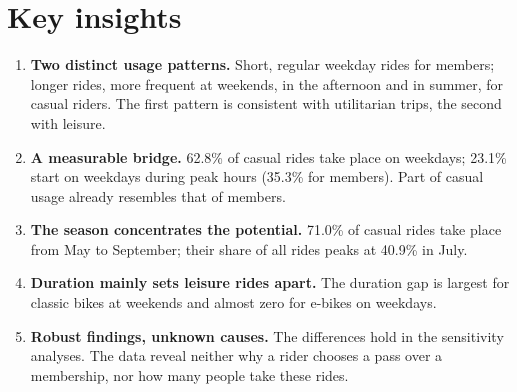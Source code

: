 \section{Key insights}
\label{sec:insights}

\begin{enumerate}
  \item \textbf{Two distinct usage patterns.} \Mes{} Short, regular weekday rides for members; longer rides, more frequent at weekends, in the afternoon and in summer, for casual riders. \Int{} The first pattern is consistent with utilitarian trips, the second with leisure.
  \item \textbf{A measurable bridge.} \Mes{} 62.8\% of casual rides take place on weekdays; 23.1\% start on weekdays during peak hours (35.3\% for members). \Int{} Part of casual usage already resembles that of members.
  \item \textbf{The season concentrates the potential.} \Mes{} 71.0\% of casual rides take place from May to September; their share of all rides peaks at 40.9\% in July.
  \item \textbf{Duration mainly sets leisure rides apart.} \Mes{} The duration gap is largest for classic bikes at weekends and almost zero for e-bikes on weekdays.
  \item \textbf{Robust findings, unknown causes.} \Mes{} The differences hold in the sensitivity analyses. \Int{} The data reveal neither why a rider chooses a pass over a membership, nor how many people take these rides.
\end{enumerate}
